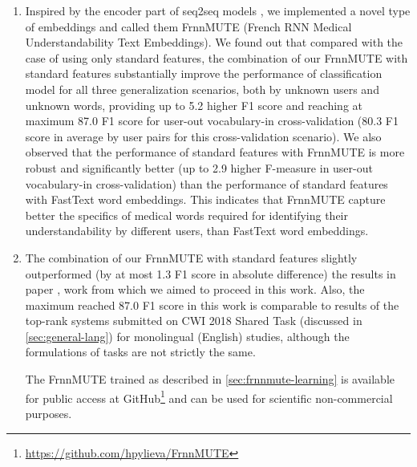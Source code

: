\begin{enumerate}[listparindent=1.5em]
    These results of applying FastText word embeddings for automatic words' categorization on data from three annotators were published and presented on 1st International Workshop on Informatics \& Data-Driven Medicine\footnote{\url{http://science.lpnu.ua/iddm-2018}} \citep{Pylieva:2018}.
    
    \item Inspired by the encoder part of seq2seq models \citep{Sutskever-NIPS2014}, we implemented a novel type of embeddings and called them FrnnMUTE (French RNN Medical Understandability Text Embeddings). We found out that compared with the case of using only standard features, the combination of our FrnnMUTE with standard features substantially improve the performance of classification model for all three generalization scenarios, both by unknown users and unknown words,  providing up to 5.2 higher F1 score and reaching at maximum 87.0 F1 score for user-out vocabulary-in cross-validation (80.3 F1 score in average by user pairs for this cross-validation scenario). We also observed that the performance of standard features with FrnnMUTE is more robust and significantly better (up to 2.9 higher F-measure in user-out vocabulary-in cross-validation) than the performance of standard features with FastText word embeddings. This indicates that FrnnMUTE capture better the specifics of medical words required for identifying their understandability by different users, than FastText word embeddings. 
    
    \item The combination of our FrnnMUTE with standard features slightly outperformed (by at most 1.3 F1 score in absolute difference) the results in paper \citep{Grabar-PITR2014}, work from which we aimed to proceed in this work.  Also, the maximum reached 87.0 F1 score in this work is comparable to results of the top-rank systems submitted on CWI 2018 Shared Task (discussed in \ref{sec:general-lang}) for monolingual (English) studies, although the formulations of tasks are not strictly the same.
    
    The FrnnMUTE trained as described in \ref{sec:frnnmute-learning} is available for public access at GitHub\footnote{\url{https://github.com/hpylieva/FrnnMUTE}} and can be used for scientific non-commercial purposes.
\end{enumerate}

